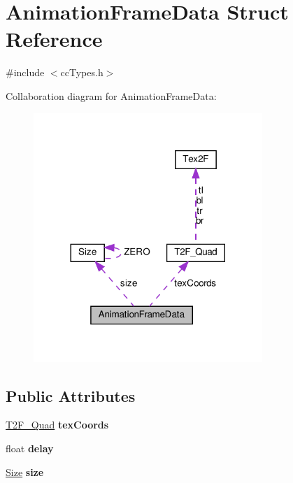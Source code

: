 \hypertarget{structAnimationFrameData}{}\section{Animation\+Frame\+Data Struct Reference}
\label{structAnimationFrameData}


{\ttfamily \#include $<$cc\+Types.\+h$>$}



Collaboration diagram for Animation\+Frame\+Data\+:
\nopagebreak
\begin{figure}[H]
\begin{center}
\leavevmode
\includegraphics[width=245pt]{structAnimationFrameData__coll__graph}
\end{center}
\end{figure}
\subsection*{Public Attributes}
\begin{DoxyCompactItemize}
\item 
\mbox{\label{structAnimationFrameData_af45006d25c448443fc1f5d5a9c36bc81}} 
\hyperlink{structT2F__Quad}{T2\+F\+\_\+\+Quad} {\bfseries tex\+Coords}
\item 
\mbox{\label{structAnimationFrameData_a08a47fb77f6d828519d55470c2da84fb}} 
float {\bfseries delay}
\item 
\mbox{\label{structAnimationFrameData_a3ba9931374c2a41b04a7f6568b7c2a97}} 
\hyperlink{classSize}{Size} {\bfseries size}
\end{DoxyCompactItemize}



